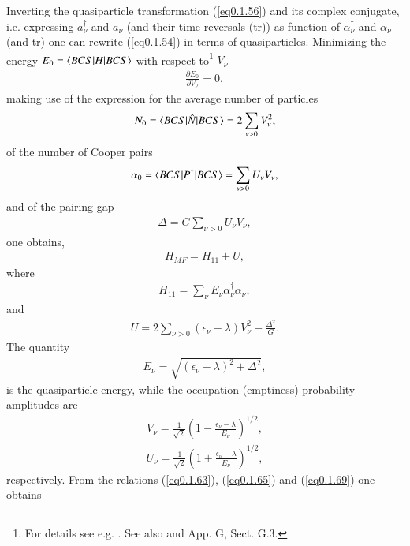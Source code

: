 Inverting the quasiparticle transformation (\ref{eq0.1.56}) and its complex conjugate, i.e. expressing $a_\nu^\dagger$ and $a_\nu$ (and their time reversals (tr)) as function of $\alpha^\dagger_\nu$ and $\alpha_\nu$ (and tr) one can rewrite (\ref{eq0.1.54}) in terms of quasiparticles.
Minimizing the energy $E_0=\langle {BCS|H|BCS} \rangle$ with respect to\footnote{For details see e.g. \cite{Ragnarsson:05}. See also \cite{Nathan:65} and \cite{Brink:05} App. G, Sect. G.3.} $V_\nu$
\begin{align}\label{eq0.1.62}
\frac{\partial E_0}{\partial V_\nu}=0,
\end{align}
 making use of the expression for the average number of particles
\begin{align}\label{eq0.1.63}
N_0=\langle {BCS|\hat N|BCS} \rangle=2\sum_{\nu>0}V_\nu^2,
\end{align}
 of the number of Cooper pairs
\begin{align}\label{eq0.1.64}
\alpha_0=\braket{BCS|P^\dagger|BCS}=\sum_{\nu>0}U_\nu V_\nu, \idx{Cooper pair!number of}
\end{align}
and of the pairing gap
\begin{align}\label{eq0.1.65}
\Delta=G\sum_{\nu>0}U_\nu V_{\nu},
\end{align}
one obtains,
\begin{align}\label{eq0.1.66}
H_{MF}=H_{11}+U,
\end{align}
where 
\begin{align}\label{eq0.1.67}
H_{11}=\sum_\nu E_\nu \alpha^\dagger_\nu\alpha_\nu,
\end{align}
and
\begin{align}\label{eq0.1.68}
U=2\sum_{\nu>0}(\epsilon_\nu-\lambda)V^2_\nu-\frac{\Delta^2}{G}.
\end{align}
The quantity
\begin{align}\label{eq0.1.69}
E_\nu=\sqrt{(\epsilon_\nu-\lambda)^2+\Delta^2},
\end{align}
is the quasiparticle energy, while the occupation (emptiness) probability amplitudes are
\begin{align}\label{eq0.1.70}
V_\nu=\frac{1}{\sqrt{2}}\left(1-\frac{\epsilon_\nu-\lambda}{E_\nu}\right)^{1/2},
\end{align}
\begin{align}\label{eq0.1.71}
U_\nu=\frac{1}{\sqrt{2}}\left(1+\frac{\epsilon_\nu-\lambda}{E_\nu}\right)^{1/2},
\end{align}
 respectively. From the relations (\ref{eq0.1.63}),  (\ref{eq0.1.65}) and (\ref{eq0.1.69}) one obtains
